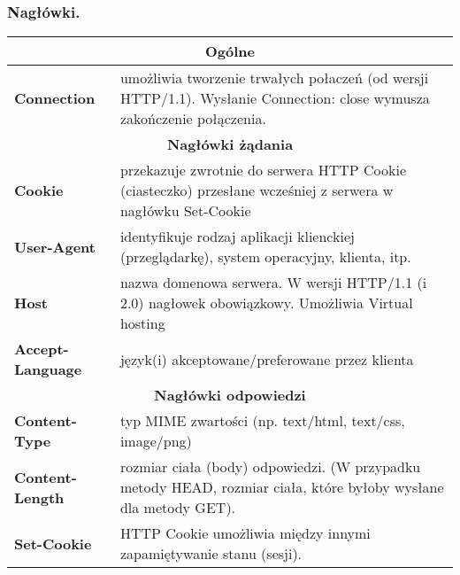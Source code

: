 \documentclass[../main.tex]{subfiles}
\begin{document}
    \subsubsection{Nagłówki.}
    \begin{table}[H]
        \begin{center}
            \begin{tabular}{|p{4cm}|p{12cm}|}
                \hline
                \multicolumn{2}{|c|}{\textbf{Ogólne}}\\
                \hline
                \textbf{Connection} & umożliwia tworzenie trwałych połaczeń (od wersji HTTP/1.1). Wysłanie Connection: close wymusza zakończenie połączenia.\\
                \hline
                \hline
                \multicolumn{2}{|c|}{\textbf{Nagłówki żądania}}\\
                \hline
                \textbf{Cookie} & przekazuje zwrotnie do serwera HTTP Cookie (ciasteczko) przesłane wcześniej z serwera w nagłówku Set-Cookie\\
                \hline
                \textbf{User-Agent} & identyfikuje rodzaj aplikacji klienckiej (przeglądarkę), system operacyjny, klienta, itp.\\
                \hline
                \textbf{Host} & nazwa domenowa serwera. W wersji HTTP/1.1 (i 2.0) nagłowek obowiązkowy. Umożliwia Virtual hosting\\
                \hline
                \textbf{Accept-Language} & język(i) akceptowane/preferowane przez klienta\\
                \hline
                \hline
                \multicolumn{2}{|c|}{\textbf{Nagłówki odpowiedzi}}\\
                \hline
                \textbf{Content-Type} & typ MIME zwartości (np. text/html, text/css, image/png)\\
                \hline
                \textbf{Content-Length} & rozmiar ciała (body) odpowiedzi. (W przypadku metody HEAD, rozmiar ciała, które byłoby wysłane dla metody GET).\\
                \hline
                \textbf{Set-Cookie} & HTTP Cookie umożliwia między innymi zapamiętywanie stanu (sesji).\\
                \hline
            \end{tabular}
        \end{center}
    \end{table}
\end{document}
